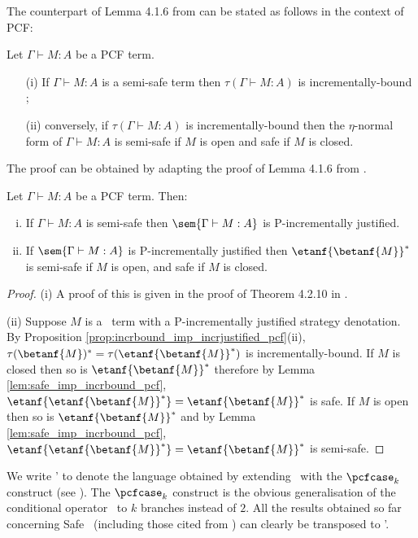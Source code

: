 The counterpart of Lemma 4.1.6 from
\cite{blumtransfer} can be stated as follows in the context of PCF:
\begin{lemma}
\label{lem:safe_imp_incrbound_pcf} Let $\Gamma \vdash M : A$ be a PCF term.
\begin{itemize}
\item[(i)] If $\Gamma \vdash M : A$ is a semi-safe term then $\tau(\Gamma \vdash M : A)$ is incrementally-bound ;
\item[(ii)] conversely, if $\tau(\Gamma \vdash M : A)$ is incrementally-bound then the $\eta$-normal form of $\Gamma \vdash M : A$ is semi-safe if $M$ is open and safe if $M$ is closed.
\end{itemize}
\end{lemma}
The proof can be obtained by adapting the proof 
of Lemma 4.1.6 from \cite{blumtransfer}.

\begin{theorem}
\label{thm:semisafeincrejust_pcf} Let $\Gamma \vdash M : A$ be a PCF term. Then:
\begin{enumerate}[(i)]
\item If $\Gamma \vdash M : A$ is semi-safe then $\sem{\Gamma \vdash M : A}$ is P-incrementally justified.
\item If $\sem{\Gamma \vdash M : A}$ is
  P-incrementally justified then $\etanf{\betanf{M}}^*$ is semi-safe  if $M$ is open, and safe if $M$ is closed.
\end{enumerate}
\end{theorem}

\begin{proof}
\noindent(i)
A proof of this is given in the proof of Theorem 4.2.10 in \cite{blumtransfer}.

\noindent(ii) 
Suppose $M$ is a \pcf\ term with a P-incrementally justified strategy denotation. By Proposition \ref{prop:incrbound_imp_incrjustified_pcf}(ii), $\tau(\betanf{M})^* = \tau(\etanf{\betanf{M}}^*)$ is incrementally-bound.
If $M$ is closed then so is $\etanf{\betanf{M}}^*$ therefore by Lemma \ref{lem:safe_imp_incrbound_pcf}, $\etanf{\etanf{\betanf{M}}^*} = \etanf{\betanf{M}}^*$ is safe. If $M$ is open then so is $\etanf{\betanf{M}}^*$ and by Lemma \ref{lem:safe_imp_incrbound_pcf}, $\etanf{\etanf{\betanf{M}}^*} = \etanf{\betanf{M}}^*$ is semi-safe.
\end{proof}


We write \pcf' to denote the language obtained by extending \pcf\
with the $\pcfcase_k$ construct (see \cite{Abr02}).
The $\pcfcase_k$ construct is the obvious generalisation of the
conditional operator \pcfcond\ to $k$ branches instead of $2$. All the results obtained so far concerning Safe \pcf\ (including those
cited from \cite{blumtransfer}) can clearly be transposed to \pcf'.

